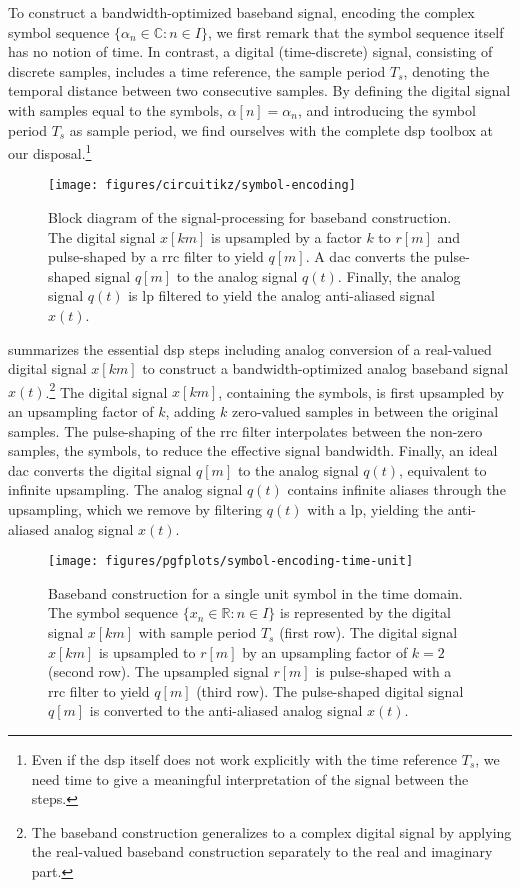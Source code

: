 To construct a bandwidth-optimized baseband signal, encoding the complex symbol sequence $\{\alpha_n\in\mathbb{C}\colon n\in I\}$, we first remark that the symbol sequence itself has no notion of time.
In contrast, a digital (time-discrete) signal, consisting of discrete samples, includes a time reference, the sample period $T_s$, denoting the temporal distance between two consecutive samples.
By defining the digital signal with samples equal to the symbols, $\alpha[n]=\alpha_n$, and introducing the symbol period $T_s$ as sample period, we find ourselves with the complete \gls{dsp} toolbox at our disposal.\footnote{Even if the \gls{dsp} itself does not work explicitly with the time reference $T_s$, we need time to give a meaningful interpretation of the signal between the steps.}
\begin{figure}[htb]
	\centering
	\texttt{[image: figures/circuitikz/symbol-encoding]}
	\caption{Block diagram of the signal-processing for baseband construction. The digital signal $x[km]$ is upsampled by a factor $k$ to $r[m]$ and pulse-shaped by a \gls{rrc} filter to yield $q[m]$. A \gls{dac} converts the pulse-shaped signal $q[m]$ to the analog signal $q(t)$. Finally, the analog signal $q(t)$ is \gls{lp} filtered to yield the analog anti-aliased signal $x(t)$.}\label{fig:symbol_encoding}
\end{figure}
 summarizes the essential \gls{dsp} steps including analog conversion of a real-valued digital signal $x[km]$ to construct a bandwidth-optimized analog baseband signal $x(t)$.\footnote{The baseband construction generalizes to a complex digital signal by applying the real-valued baseband construction separately to the real and imaginary part.}
The digital signal $x[km]$, containing the symbols, is first upsampled by an upsampling factor of $k$, adding $k$ zero-valued samples in between the original samples.
The pulse-shaping of the \gls{rrc} filter interpolates between the non-zero samples, the symbols, to reduce the effective signal bandwidth.
Finally, an ideal \gls{dac} converts the digital signal $q[m]$ to the analog signal $q(t)$, equivalent to infinite upsampling.
The analog signal $q(t)$ contains infinite aliases through the upsampling, which we remove by filtering $q(t)$ with a \gls{lp}, yielding the anti-aliased analog signal $x(t)$.
\begin{figure}[htb]
	\centering
	\texttt{[image: figures/pgfplots/symbol-encoding-time-unit]}
	\caption{Baseband construction for a single unit symbol in the time domain. The symbol sequence $\{x_n\in\mathbb{R}\colon n\in I\}$ is represented by the digital signal $x[km]$ with sample period $T_s$ (first row). The digital signal $x[km]$ is upsampled to $r[m]$ by an upsampling factor of $k=2$ (second row). The upsampled signal $r[m]$ is pulse-shaped with a \gls{rrc} filter to yield $q[m]$ (third row). The pulse-shaped digital signal $q[m]$ is converted to the anti-aliased analog signal $x(t)$.}\label{fig:baseband_construction_unit_time}
\end{figure}
